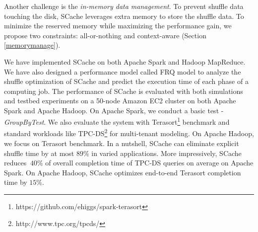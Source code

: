 Another challenge is the \textit{in-memory data management}. 
To prevent shuffle data touching the disk, SCache leverages extra memory to store the shuffle data. 
To minimize the reserved memory while maximizing the performance gain, we propose two constraints: all-or-nothing and context-aware (Section \ref{memorymanage}).


{\color{blue}
We have implemented SCache on both Apache Spark \cite{apachespark} and Hadoop MapReduce. We have also designed a performance model called FRQ model to analyze the shuffle optimization of SCache and predict the execution time of each phase of a computing job. The performance of SCache is evaluated with both simulations and testbed experiments on a 50-node Amazon EC2 cluster on both Apache Spark and Apache Hadoop. On Apache Spark, we conduct a basic test - \textit{GroupByTest}. We also evaluate the system with Terasort\footnote{https://github.com/ehiggs/spark-terasort} benchmark and standard workloads like TPC-DS\footnote{http://www.tpc.org/tpcds/} for multi-tenant modeling. On Apache Hadoop, we focus on Terasort benchmark. In a nutshell, SCache can eliminate explicit shuffle time by at most $89\%$ in varied applications. More impressively, SCache reduces $~40\%$ of overall completion time of TPC-DS queries on average on Apache Spark. On Apache Hadoop, SCache optimizes end-to-end Terasort completion time by $15\%$.
}
